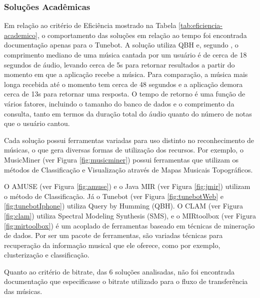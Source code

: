 \subsubsection{Soluções Acadêmicas}

Em relação ao critério de Eficiência mostrado na Tabela \ref{tab:eficiencia-academico}, o comportamento das soluções em relação ao tempo foi encontrada documentação apenas para o Tunebot. A solução utiliza QBH e, segundo \cite{tunebot}, o comprimento mediano de uma música cantada por um usuário é de cerca de 18 segundos de áudio, levando cerca de 5s para retornar resultados a partir do momento em que a aplicação recebe a música. Para comparação, a música mais longa recebida até o momento tem cerca de 48 segundos e a aplicação demora cerca de 13s para retornar uma resposta. O tempo de retorno é uma função de vários fatores, incluindo o tamanho do banco de dados e o comprimento da consulta, tanto em termos da duração total do áudio quanto do número de notas que o usuário cantou.

Cada solução possui ferramentas variadas para uso distinto no reconhecimento de músicas, o que gera diversas formas de utilização dos recursos. Por exemplo, o MusicMiner (ver Figura \ref{fig:musicminer}) possui ferramentas que utilizam os métodos de Classificação e Visualização através de Mapas Musicais Topográficos.

O AMUSE (ver Figura \ref{fig:amuse}) e o Java MIR (ver Figura \ref{fig:jmir}) utilizam o método de Classificação. Já o Tunebot (ver Figura \ref{fig:tunebotWeb} e \ref{fig:tunebotIphone}) utiliza Query by Humming (QBH). O CLAM (ver Figura \ref{fig:clam}) utiliza Spectral Modeling Synthesis (SMS), e o MIRtoolbox (ver Figura \ref{fig:mirtoolbox}) é um acoplado de ferramentas baseado em técnicas de mineração de dados. Por ser um pacote de ferramentas, são variadas técnicas para recuperação da informação musical que ele oferece, como por exemplo, clusterização e classificação.

Quanto ao critério de bitrate, das 6 soluções analisadas, não foi encontrada documentação que especificasse o bitrate utilizado para o fluxo de transferência das músicas.

